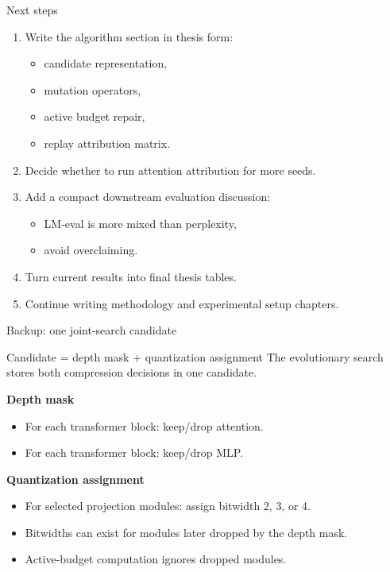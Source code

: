\documentclass[aspectratio=169]{beamer}
\begin{document}

\begin{frame}{Next steps}
\begin{enumerate}
    \item Write the algorithm section in thesis form:
    \begin{itemize}
        \item candidate representation,
        \item mutation operators,
        \item active budget repair,
        \item replay attribution matrix.
    \end{itemize}
    \item Decide whether to run attention attribution for more seeds.
    \item Add a compact downstream evaluation discussion:
    \begin{itemize}
        \item LM-eval is more mixed than perplexity,
        \item avoid overclaiming.
    \end{itemize}
    \item Turn current results into final thesis tables.
    \item Continue writing methodology and experimental setup chapters.
\end{enumerate}
\end{frame}


\appendix

\begin{frame}{Backup: one joint-search candidate}
\begin{block}{Candidate = depth mask + quantization assignment}
The evolutionary search stores both compression decisions in one candidate.
\end{block}

\vspace{0.2cm}
\textbf{Depth mask}
\begin{itemize}
    \item For each transformer block: keep/drop attention.
    \item For each transformer block: keep/drop MLP.
\end{itemize}

\vspace{0.15cm}
\textbf{Quantization assignment}
\begin{itemize}
    \item For selected projection modules: assign bitwidth 2, 3, or 4.
    \item Bitwidths can exist for modules later dropped by the depth mask.
    \item Active-budget computation ignores dropped modules.
\end{itemize}
\end{frame}
\end{document}
